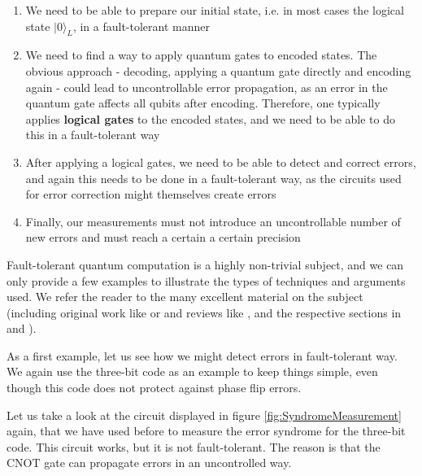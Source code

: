 \documentclass[a4paper, draft]{article}
\theoremstyle{own}
\theoremstyle{remark}
\begin{document}
\begin{enumerate}
	\item We need to be able to prepare our initial state, i.e. in most cases the logical state $|0 \rangle_L$, in a fault-tolerant manner
	\item We need to find a way to apply quantum gates to encoded states. The obvious approach - decoding, applying a quantum gate directly and encoding again - could lead to uncontrollable error propagation, as an error in the quantum gate affects all qubits after encoding. Therefore, one typically applies {\bf logical gates} to the encoded states, and we need to be able to do this in a fault-tolerant way
	\item After applying a logical gates, we need to be able to detect and correct errors, and again this needs to be done in a fault-tolerant way, as the circuits used for error correction might themselves create errors
	\item Finally, our measurements must not introduce an uncontrollable number of new errors and must reach a certain a certain precision
\end{enumerate}

Fault-tolerant quantum computation is a highly non-trivial subject, and we can only provide a few examples to illustrate the types of techniques and arguments used. We refer the reader to the many excellent material on the subject (including original work like \cite{Shor96} or \cite{GThesis} and reviews like \cite{Kempe}, \cite{Beginners} and the respective sections in \cite{RieffelPolak} and \cite{NC}).

As a first example, let us see how we might detect errors in fault-tolerant way. We again use the three-bit code as an example to keep things simple, even though this code does not protect against phase flip errors.

Let us take a look at the circuit displayed in figure \ref{fig:SyndromeMeasurement} again, that we have used before to measure the error syndrome for the three-bit code. This circuit works, but it is not fault-tolerant. The reason is that the CNOT gate can propagate errors in an uncontrolled way.
\end{document}
